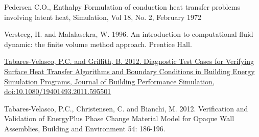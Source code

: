 Pedersen C.O., Enthalpy Formulation of conduction heat transfer problems involving latent heat, Simulation, Vol 18, No. 2, February 1972

Versteeg, H. and Malalasekra, W. 1996. An introduction to computational fluid dynamic: the finite volume method approach. Prentice Hall.

\href{../../../Documents\%20and\%20Settings/ptabares/My\%20Documents/Paulo/CV/Tabares\%20Velasco\%20CV\%20UPDATED2.doc}{Tabares-Velasco, P.C. and Griffith, B. 2012. Diagnostic Test Cases for Verifying Surface Heat Transfer Algorithms and Boundary Conditions in Building Energy Simulation Programs, Journal of Building Performance Simulation, doi:10.1080/19401493.2011.595501}

Tabares-Velasco, P.C., Christensen, C. and Bianchi, M. 2012. Verification and Validation of EnergyPlus Phase Change Material Model for Opaque Wall Assemblies, Building and Environment 54: 186-196.
